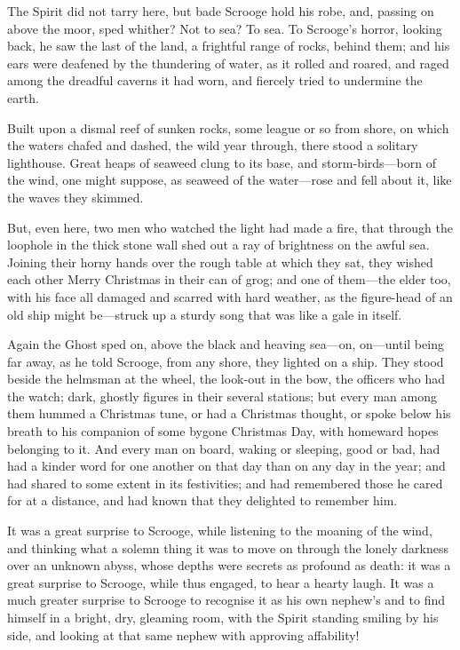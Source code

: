 \documentclass[paper=5.5in:8.5in,BCOR=15mm,twoside,DIV=15,headinclude=off,12pt,chapterprefix=off,openany,headings=huge]{scrbook} %
\begin{document}
The Spirit did not tarry here, but bade Scrooge hold his robe, and, passing on above the moor, sped whither? Not to sea? To sea. To Scrooge's horror, looking back, he saw the last of the land, a frightful range of rocks, behind them; and his ears were deafened by the thundering of water, as it rolled and roared, and raged among the dreadful caverns it had worn, and fiercely tried to undermine the earth.

Built upon a dismal reef of sunken rocks, some league or so from shore, on which the waters chafed and dashed, the wild year through, there stood a solitary lighthouse. Great heaps of seaweed clung to its base, and storm-birds—born of the wind, one might suppose, as seaweed of the water—rose and fell about it, like the waves they skimmed.

But, even here, two men who watched the light had made a fire, that through the loophole in the thick stone wall shed out a ray of brightness on the awful sea. Joining their horny hands over the rough table at which they sat, they wished each other Merry Christmas in their can of grog; and one of them—the elder too, with his face all damaged and scarred with hard weather, as the figure-head of an old ship might be—struck up a sturdy song that was like a gale in itself.

Again the Ghost sped on, above the black and heaving sea—on, on—until being far away, as he told Scrooge, from any shore, they lighted on a ship. They stood beside the helmsman at the wheel, the look-out in the bow, the officers who had the watch; dark, ghostly figures in their several stations; but every man among them hummed a Christmas tune, or had a Christmas thought, or spoke below his breath to his companion of some bygone Christmas Day, with homeward hopes belonging to it. And every man on board, waking or sleeping, good or bad, had had a kinder word for one another on that day than on any day in the year; and had shared to some extent in its festivities; and had remembered those he cared for at a distance, and had known that they delighted to remember him.

It was a great surprise to Scrooge, while listening to the moaning of the wind, and thinking what a solemn thing it was to move on through the lonely darkness over an unknown abyss, whose depths were secrets as profound as death: it was a great surprise to Scrooge, while thus engaged, to hear a hearty laugh. It was a much greater surprise to Scrooge to recognise it as his own nephew's and to find himself in a bright, dry, gleaming room, with the Spirit standing smiling by his side, and looking at that same nephew with approving affability!
\end{document}
